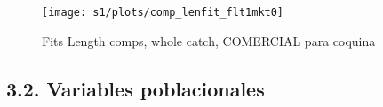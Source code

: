 \documentclass[
]{article}
\begin{document}
\begin{figure}[H]

{\centering \texttt{[image: s1/plots/comp\_lenfit\_flt1mkt0]} 

}

\caption{\label{fig:fitcom}Fits Length comps, whole catch, COMERCIAL para coquina}\label{fig:fitcom}
\end{figure}

\pagebreak

\hypertarget{variables-poblacionales}{%
\subsection{3.2. Variables poblacionales}\label{variables-poblacionales}}

\begin{table}[ht!]


\end{table}
\end{document}
